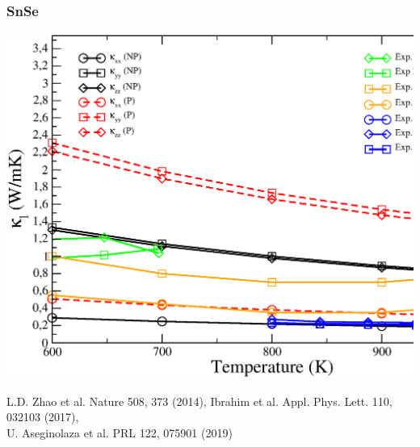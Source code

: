 \documentclass{beamer}
\begin{document}

\begin{frame}

\frametitle{SnSe}
\begin{center}
 \includegraphics[width=0.80\linewidth]{Pictures/SnSe/tk-SnSe2.eps}
\end{center}
\begin{tiny}
 L.D. Zhao et al. Nature 508, 373 (2014),
 Ibrahim et al. Appl. Phys. Lett. 110, 032103 (2017), \\
 U. Aseginolaza et al. PRL 122, 075901 (2019)
\end{tiny}

\end{frame}

\end{document}
